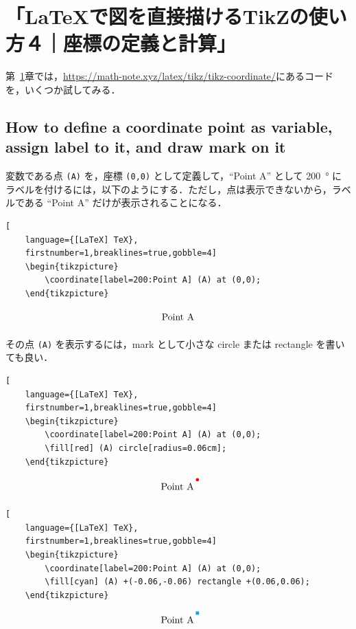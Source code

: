 \documentclass[lualatex]{jlreq}
\begin{document}
\section{「\LaTeX{}で図を直接描けるTikZの使い方４｜座標の定義と計算」}
\label{coordinatedefcalc}

第~\ref{coordinatedefcalc}章では，\url{https://math-note.xyz/latex/tikz/tikz-coordinate/}にあるコードを，いくつか試してみる．

\subsection{How to define a coordinate point as variable, assign label to it, and draw mark on it}

変数である点 \verb|(A)| を，座標 \verb|(0,0)| として定義して，``Point A'' として \qty{200}{\degree} にラベルを付けるには，以下のようにする．ただし，点は表示できないから，ラベルである ``Point A'' だけが表示されることになる．

\begin{lstlisting}[
    language={[LaTeX] TeX},
    firstnumber=1,breaklines=true,gobble=4]
    \begin{tikzpicture}
        \coordinate[label=200:Point A] (A) at (0,0);
    \end{tikzpicture}
\end{lstlisting}
\[
    \begin{tikzpicture}
        \coordinate[label=200:Point A] (A) at (0,0);
    \end{tikzpicture}
\]

その点 \verb|(A)| を表示するには，mark として小さな circle または rectangle を書いても良い．
\begin{lstlisting}[
    language={[LaTeX] TeX},
    firstnumber=1,breaklines=true,gobble=4]
    \begin{tikzpicture}
        \coordinate[label=200:Point A] (A) at (0,0);
        \fill[red] (A) circle[radius=0.06cm];
    \end{tikzpicture}
\end{lstlisting}
\[
    \begin{tikzpicture}
        \coordinate[label=200:Point A] (A) at (0,0);
        \fill[red] (A) circle[radius=0.06cm];
    \end{tikzpicture}
\]
\begin{lstlisting}[
    language={[LaTeX] TeX},
    firstnumber=1,breaklines=true,gobble=4]
    \begin{tikzpicture}
        \coordinate[label=200:Point A] (A) at (0,0);
        \fill[cyan] (A) +(-0.06,-0.06) rectangle +(0.06,0.06);
    \end{tikzpicture}
\end{lstlisting}
\[
    \begin{tikzpicture}
        \coordinate[label=200:Point A] (A) at (0,0);
        \fill[cyan] (A) +(-0.06,-0.06) rectangle +(0.06,0.06);
    \end{tikzpicture}
\]
\end{document}
